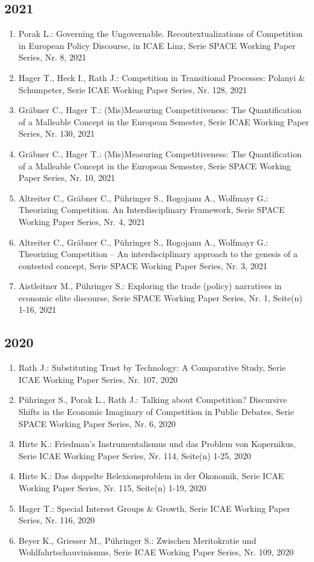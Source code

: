 \subsection*{2021}
\begin{enumerate}
    	 \item Porak L.: Governing the Ungovernable. Recontextualizations of Competition in European Policy Discourse, in ICAE Linz, Serie SPACE Working Paper Series, Nr. 8, 2021
	 \item Hager T., Heck I., Rath J.: Competition in Transitional Processes: Polanyi \& Schumpeter, Serie ICAE Working Paper Series, Nr. 128, 2021
	 \item Gräbner C., Hager T.: (Mis)Measuring Competitiveness: The Quantification of a Malleable Concept in the European Semester, Serie ICAE Working Paper Series, Nr. 130, 2021
	 \item Gräbner C., Hager T.: (Mis)Measuring Competitiveness: The Quantification of a Malleable Concept in the European Semester, Serie SPACE Working Paper Series, Nr. 10, 2021
	 \item Altreiter C., Gräbner C., Pühringer S., Rogojanu A., Wolfmayr G.: Theorizing Competition. An Interdisciplinary Framework, Serie SPACE Working Paper Series, Nr. 4, 2021
	 \item Altreiter C., Gräbner C., Pühringer S., Rogojanu A., Wolfmayr G.: Theorizing Competition -- An interdisciplinary approach to the genesis of a contested concept, Serie SPACE Working Paper Series, Nr. 3, 2021
	 \item Aistleitner M., Pühringer S.: Exploring the trade (policy) narratives in economic elite discourse, Serie SPACE Working Paper Series, Nr. 1, Seite(n) 1-16, 2021
\end{enumerate}
\subsection*{2020}
\begin{enumerate}
    	 \item Rath J.: Substituting Trust by Technology: A Comparative Study, Serie ICAE Working Paper Series, Nr. 107, 2020
	 \item Pühringer S., Porak L., Rath J.: Talking about Competition? Discursive Shifts in the Economic Imaginary of Competition in Public Debates, Serie SPACE Working Paper Series, Nr. 6, 2020
	 \item Hirte K.: Friedman’s Instrumentalismus und das Problem von Kopernikus, Serie ICAE Working Paper Series, Nr. 114, Seite(n) 1-25, 2020
	 \item Hirte K.: Das doppelte Relexionsproblem in der Ökonomik, Serie ICAE Working Paper Series, Nr. 115, Seite(n) 1-19, 2020
	 \item Hager T.: Special Interest Groups \& Growth, Serie ICAE Working Paper Series, Nr. 116, 2020
	 \item Beyer K., Griesser M., Pühringer S.: Zwischen Meritokratie und Wohlfahrtschauvinismus, Serie ICAE Working Paper Series, Nr. 109, 2020
\end{enumerate}
